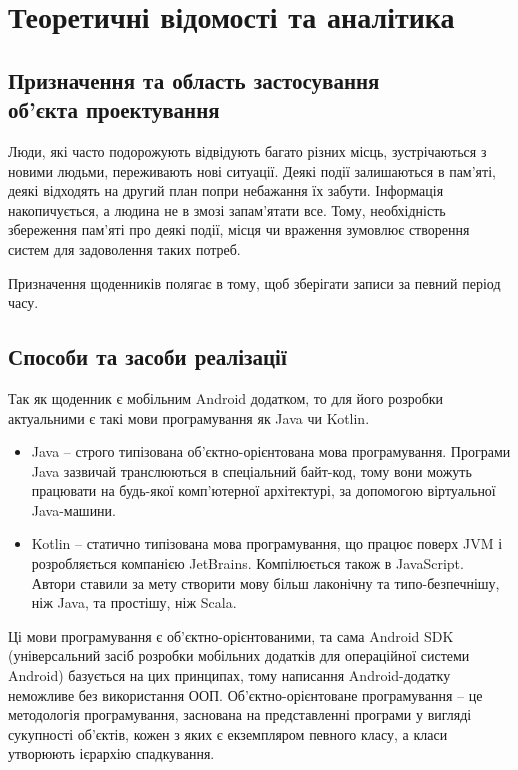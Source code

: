 \documentclass[../main.tex]{subfiles}
\begin{document}
\chapter{Теоретичні відомості та аналітика}

\section{Призначення та область застосування \\об'єкта проектування}

Люди, які часто подорожують відвідують багато різних місць, зустрічаються з новими людьми, переживають нові ситуації. Деякі події залишаються в пам'яті, деякі відходять на другий план попри небажання їх забути. Інформація накопичується, а людина не в змозі запам'ятати все. Тому, необхідність збереження пам'яті про деякі події, місця чи враження зумовлює створення систем для задоволення таких потреб.

Призначення щоденників полягає в тому, щоб зберігати записи за певний період часу. 

\section{Способи та засоби реалізації}

Так як щоденник є мобільним Android додатком, то для його розробки актуальними є такі мови програмування як Java чи Kotlin. 

\begin{itemize}
    \item Java – строго типізована об'єктно-орієнтована мова програмування. Програми Java зазвичай транслюються в спеціальний байт-код, тому вони можуть працювати на будь-якої комп'ютерної архітектурі, за допомогою віртуальної Java-машини.
    \item Kotlin – статично типізована мова програмування, що працює поверх JVM і розробляється компанією JetBrains. Компілюється також в JavaScript. Автори ставили за мету створити мову більш лаконічну та типо-безпечнішу, ніж Java, та простішу, ніж Scala.
\end{itemize}

Ці мови програмування є об'єктно-орієнтованими, та сама Android SDK (універсальний засіб розробки мобільних додатків для операційної системи Android) базується на цих принципах, тому написання Android-додатку неможливе без використання ООП. Об'єктно-орієнтоване програмування – це методологія програмування, заснована на представленні програми у вигляді сукупності об'єктів, кожен з яких є екземпляром певного класу, а класи утворюють ієрархію спадкування.
\end{document}
